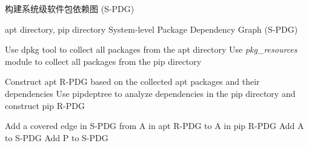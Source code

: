 \begin{algorithm}[htbp]
	\caption{构建系统级软件包依赖图 (S-PDG)}
	\label{alg:BuildSPDG}
	\begin{algorithmic}[1]
		\REQUIRE apt directory, pip directory
		\ENSURE System-level Package Dependency Graph (S-PDG)
		
		\STATE Use dpkg tool to collect all packages from the apt directory
		\STATE Use \textit{pkg\_resources} module to collect all packages from the pip directory
		
		\STATE Construct apt R-PDG based on the collected apt packages and their dependencies
		\STATE Use pipdeptree to analyze dependencies in the pip directory and construct pip R-PDG
		
		\STATE Add a covered edge in S-PDG from A in apt R-PDG to A in pip R-PDG
		\ELSE
		\STATE Add A to S-PDG
		\ENDIF
		\ENDFOR
		\STATE Add P to S-PDG
		\ENDFOR
	\end{algorithmic}
\end{algorithm}
